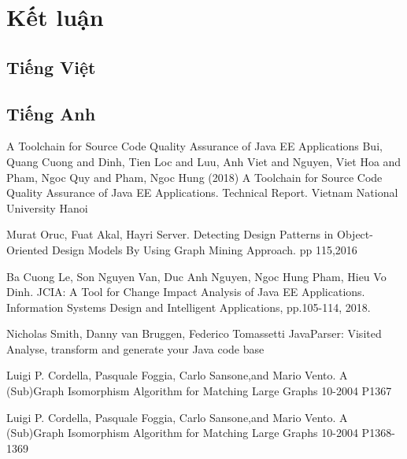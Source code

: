\documentclass[12pt]{report}
\begin{document}
\chapter{Kết luận}
\begin{thebibliography}{9}
	\section*{Tiếng Việt}
	\section*{Tiếng Anh}
	
	A Toolchain for Source Code Quality Assurance of Java EE Applications
	Bui, Quang Cuong and Dinh, Tien Loc and Luu, Anh Viet and Nguyen, Viet Hoa and Pham, Ngoc Quy and Pham, Ngoc Hung (2018) A Toolchain for Source Code Quality Assurance of Java EE Applications. Technical Report. Vietnam National University Hanoi
	
	 Murat Oruc, Fuat Akal, Hayri Server. Detecting Design Patterns in  Object-Oriented Design Models By Using Graph Mining Approach. pp 115,2016
	
	Ba Cuong Le, Son Nguyen Van, Duc Anh Nguyen, Ngoc Hung Pham, Hieu Vo Dinh. JCIA: A Tool for Change Impact Analysis of Java EE Applications. Information Systems Design and Intelligent Applications, pp.105-114, 2018.
	
	Nicholas Smith, Danny van Bruggen, Federico Tomassetti
	JavaParser: Visited
	Analyse, transform and generate your Java code base
	
	Luigi P. Cordella, Pasquale Foggia, Carlo Sansone,and Mario Vento. A (Sub)Graph Isomorphism Algorithm for
	Matching Large Graphs 10-2004 P1367
	
	Luigi P. Cordella, Pasquale Foggia, Carlo Sansone,and Mario Vento. A (Sub)Graph Isomorphism Algorithm for
	Matching Large Graphs 10-2004 P1368-1369
\end{thebibliography}
\end{document}
